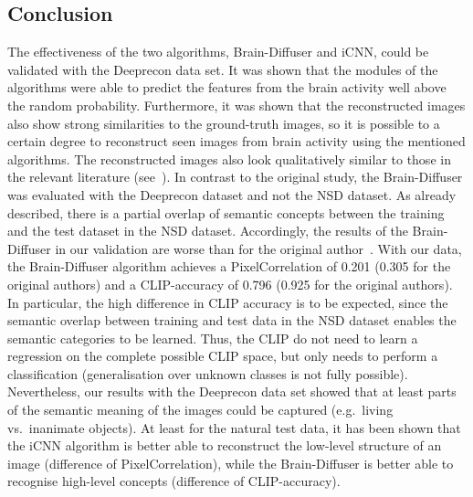 \subsection{Conclusion}
The effectiveness of the two algorithms, Brain-Diffuser and iCNN, could be validated with the Deeprecon data set. It was shown that the  modules of the algorithms were able to predict the features from the brain activity well above the random probability. Furthermore, it was shown that the reconstructed images also show strong similarities to the ground-truth images, so it is possible to a certain degree to reconstruct seen images from brain activity using the mentioned algorithms. The reconstructed images also look qualitatively similar to those in the relevant literature (see~\cite{shenDeepImageReconstruction2019, shirakawaSpuriousReconstructionBrain2024, ozcelikNaturalSceneReconstruction2023}).
In contrast to the original study, the Brain-Diffuser was evaluated with the Deeprecon dataset and not the NSD dataset. As already described, there is a partial overlap of semantic concepts between the training and the test dataset in the NSD dataset. Accordingly, the results of the Brain-Diffuser in our validation are worse than for the original author~\cite{ozcelikNaturalSceneReconstruction2023}. With our data, the Brain-Diffuser algorithm achieves a PixelCorrelation of 0.201 (0.305 for the original authors) and a CLIP-accuracy of 0.796 (0.925 for the original authors). In particular, the high difference in CLIP accuracy is to be expected, since the semantic overlap between training and test data in the NSD dataset enables the semantic categories to be learned. Thus, the CLIP  do not need to learn a regression on the complete possible CLIP space, but only needs to perform a classification (generalisation over unknown classes is not fully possible). 
Nevertheless, our results with the Deeprecon data set showed that at least parts of the semantic meaning of the images could be captured (e.g.\ living vs.\ inanimate objects). At least for the natural test data, it has been shown that the iCNN algorithm is better able to reconstruct the low-level structure of an image (difference of PixelCorrelation), while the Brain-Diffuser is better able to recognise high-level concepts (difference of CLIP-accuracy). 
